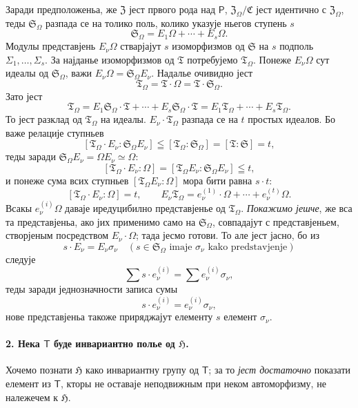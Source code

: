 \documentclass[11pt]{article}
\begin{document}
Заради предположеньа, же \(\mathfrak Z\) јест првого рода над \(\mathsf P\), \(\mathfrak Z_\Omega/\mathfrak C\) јест идентично с \(\mathfrak Z_\Omega\), теды \(\mathfrak S_\Omega\) разпада се на толико поль, колико указује ньегов ступень \(s\)
\[
\mathfrak S_\Omega = E_1\Omega+\cdots+E_s\Omega .
\]
Модулы представјень \(E_\nu\Omega\) стварјајут \(s\) изоморфизмов од \(\mathfrak S\) на \(s\) подполь \(\Sigma_1,\ldots,\Sigma_s\). За најданье изоморфизмов од \(\mathfrak T\) потребујемо \(\mathfrak T_\Omega\). Понеже \(E_\nu\Omega\) сут идеалы од \(\mathfrak S_\Omega\), важи \(E_\nu\Omega=\mathfrak S_\Omega E_\nu\). Надалье очивидно јест
\[
\mathfrak T_\Omega=\mathfrak T\cdot\Omega=\mathfrak T\cdot\mathfrak S_\Omega .
\]
Зато јест
\[
\mathfrak T_\Omega
=E_1\mathfrak S_\Omega\cdot\mathfrak T+\cdots+E_s\mathfrak S_\Omega\cdot\mathfrak T
=E_1\mathfrak T_\Omega+\cdots+E_s\mathfrak T_\Omega .
\]
То јест разклад од \(\mathfrak T_\Omega\) на идеалы. \(E_\nu\cdot\mathfrak T_\Omega\) разпада се на \(t\) простых идеалов. Бо важе релације ступньев
\[
[\mathfrak T_\Omega\cdot E_\nu:\mathfrak S_\Omega E_\nu]
\leqq [\mathfrak T_\Omega:\mathfrak S_\Omega]=[\mathfrak T:\mathfrak S]=t,
\]
теды заради \(\mathfrak S_\Omega E_\nu=\Omega E_\nu\simeq\Omega\):
\[
[\mathfrak T_\Omega\cdot E_\nu:\Omega]
=[\mathfrak T_\Omega E_\nu:\mathfrak S_\Omega E_\nu]\leqq t,
\]
и понеже сума всих ступньев \([\mathfrak T_\Omega E_\nu:\Omega]\) мора бити равна \(s\cdot t\):
\[
[\mathfrak T_\Omega\cdot E_\nu:\Omega]=t,\qquad
E_\nu\mathfrak T_\Omega=e_\nu^{(1)}\cdot\Omega+\cdots+e_\nu^{(t)}\Omega .
\]
Всакы \(e_\nu^{(i)}\Omega\) даваје иредуцибилно представјенье од \(\mathfrak T_\Omega\). \emph{Покажимо јешче}, же вса та представјеньа, ако јих применимо само на \(\mathfrak S_\Omega\), совпадајут с представјеньем, створјеным посредством \(E_\nu\cdot\Omega\); тада јесмо готови. То але јест јасно, бо из
\[
s\cdot E_\nu=E_\nu\sigma_\nu\quad
(s\in\mathfrak S_\Omega\text{ imaje }\sigma_\nu\text{ kako predstavjenje})
\]
следује
\[
\sum s\cdot e_\nu^{(i)}=\sum e_\nu^{(i)}\sigma_\nu,
\]
теды заради једнозначности записа сумы
\[
s\cdot e_\nu^{(i)}=e_\nu^{(i)}\sigma_\nu,
\]
нове представјеньа такоже приряджајут елементу \(s\) елемент \(\sigma_\nu\).

\paragraph{2. Нека \(\mathsf T\) буде инвариантно полье од \(\mathfrak H\).}
Хочемо познати \(\mathfrak H\) како инвариантну групу од \(\mathsf T\); за то \emph{јест достаточно} показати елемент из \(\mathsf T\), кторы не оставаје неподвижным при неком автоморфизму, не належечем к \(\mathfrak H\).
\end{document}
